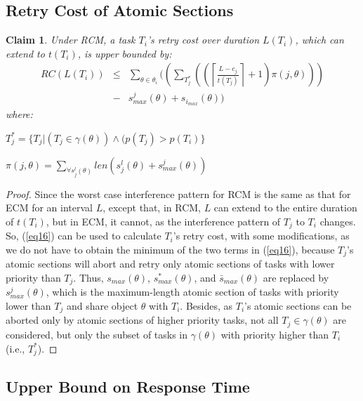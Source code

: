 \documentclass[a4paper,english]{article}
\newtheorem{clm}{Claim}
\newtheorem{proof}{Proof}
\begin{document}
\subsection{Retry Cost of Atomic Sections}

\begin{clm}
Under RCM, a task $T_i$'s retry cost over duration $L(T_i)$, which can extend to $t(T_i)$, is upper bounded by:
\begin{eqnarray}
RC\left(L\left(T_{i}\right)\right) & \le & \sum_{\theta\in\theta_{i}}\Bigg(\left(\sum_{T_{j}^{*}}\left(\left(\left\lceil\frac{L-c_{j}}{t\left(T_{j}\right)}\right\rceil+1\right)\pi\left(j,\theta\right)\right)\right)\nonumber \\
 & - & s_{max}^{j}\left(\theta\right)+s_{i_{max}}\left(\theta\right)\Bigg)\label{eq20}\end{eqnarray}
 where:
 \begin{compactitem}
\item $T_{j}^{*}=\{T_{j}|(T_{j}\in\gamma(\theta))\wedge(p(T_{j})> p(T_{i})\}$
\item $\pi(j,\theta)=\sum_{\forall s_{j}^{l}(\theta)}len\left(s_{j}^{l}\left(\theta\right)+s_{max}^{j}\left(\theta\right)\right)$
\end{compactitem}
\end{clm}
\begin{proof}\normalfont
Since the worst case interference pattern for RCM is the same as that for ECM for an interval $L$, except that, in RCM, $L$ can extend to the entire duration of $t(T_i)$, but in ECM, it cannot, as the interference pattern of $T_j$ to $T_i$ changes. 
So, (\ref{eq16}) can be used to calculate $T_i$'s retry cost, with some modifications, as we do not have to obtain the minimum of the two terms in (\ref{eq16}), because $T_j$'s atomic sections will abort and retry only atomic sections of tasks with lower priority than $T_j$. Thus, $s_{max}(\theta)$, $s_{max}^*(\theta)$, and $\bar{s}_{max}(\theta)$ are replaced by $s_{max}^j(\theta)$, which is the maximum-length atomic section of tasks with priority lower than $T_j$ and share object $\theta$ with $T_i$. Besides, as $T_i$'s atomic sections can be aborted only by atomic sections of higher priority tasks, not all $T_j \in \gamma (\theta)$ are considered, but only the subset of tasks in $\gamma (\theta)$ with priority higher than $T_i$ (i.e., $T_j^*$). 
\end{proof}



\subsection{Upper Bound on Response Time}
\end{document}
